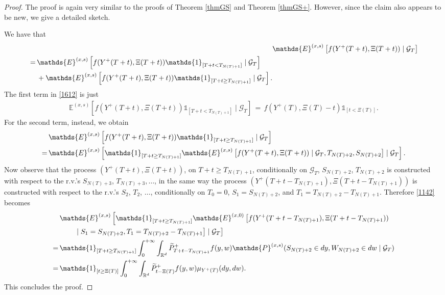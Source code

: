 \documentclass[10pt,a4paper]{amsart}
\newcommand{\wt}{\widetilde}
\begin{document}
	\begin{proof}
		The proof is again very similar to the proofs of Theorem \ref{thmGS} and Theorem \ref{thmGS+}. However, since the claim also appears to be new, we give a detailed sketch.
		
		We have that
		\begin{align}
			&\mathds{E}^{(x,s)} \left[ f(Y^+(T+t), \Xi(T+t)) \mid \mathcal{G}_T \right] \notag \\
			\begin{split}\label{1612}
				\, = \, & \mathds{E}^{(x,s)} \left[ f(Y^+(T+t), \Xi(T+t)) \mathds{1}_{[T+t < T_{N(T)+1}]} \mid \mathcal{G}_T \right] \notag \\ & + \mathds{E}^{(x,s)} \left[ f(Y^+(T+t), \Xi(T+t)) \mathds{1}_{[T+t \geq T_{N(T)+1}]} \mid \mathcal{G}_T \right].
			\end{split}
		\end{align}
		The first term in \eqref{1612} is just
		\begin{align}
			\mathds{E}^{(x,s)} \left[ f(Y^+(T+t), \Xi(T+t)) \mathds{1}_{[T+t < T_{N(T)+1}]} \mid \mathcal{G}_T \right] \, = \, f(Y^+(T), \Xi(T)-t)\mathds{1}_{[t < \Xi(T)]}.
		\end{align}
		For the second term, instead, we obtain
		\begin{align}
			&\mathds{E}^{(x,s)} \left[ f(Y^+(T+t), \Xi(T+t)) \mathds{1}_{[T+t \geq T_{N(T)+1}]} \mid \mathcal{G}_T \right] \notag \\
			= \, &\mathds{E}^{(x,s)} \left[ \mathds{1}_{[T+t \geq T_{N(T)+1}]} \mathds{E}^{(x,s)} \left[  f(Y^+(T+t), \Xi(T+t)) \mid \mathcal{G}_T, T_{N(T)+2}, S_{N(T)+2} \right] \mid \mathcal{G}_T  \right].\label{1142}
		\end{align}
		Now observe that the process $(Y^+(T+t), \Xi(T+t))$, on $T+t \geq T_{N(T)+1}$, conditionally on $\mathcal{G}_T$, $S_{N(T)+2}$, $T_{N(T)+2}$ is constructed with respect to the r.v.'s $S_{N(T)+3}$, $T_{N(T)+3},\dots$, in the same way the process $(Y^+(T+t-T_{N(T)+1}), \Xi(T+t-T_{N(T)+1}))$ is constructed with respect to the r.v.'s $S_2$, $T_2$, $\dots$, conditionally on $T_0=0$, $S_1 = S_{N(T)+2}$, and $T_1 = T_{N(T)+2}-T_{N(T)+1}$. Therefore \eqref{1142} becomes
		\begin{align}
			&\mathds{E}^{(x,s)} \left[ \mathds{1}_{[T+t \geq T_{N(T)+1}]} \mathds{E}^{(x,0)} \left[  f(Y^+(T+t-T_{N(T)+1}), \Xi(T+t-T_{N(T)+1})) \right. \right. \notag  \\ & \left. \left. \qquad \mid S_1=S_{N(T)+2}, T_1= T_{N(T)+2}-T_{N(T)+1} \right] \mid \mathcal{G}_T  \right] \notag \\
			= \, &\mathds{1}_{[T+t \geq T_{N(T)+1}]} \int_0^{+\infty} \int_{\mathbb{R}^d} \wt P^+_{T+t-T_{N(T)+1}}f(y, w) \mathds{P}^{(x,s)} (S_{N(T)+2} \in dy, W_{N(T)+2} \in dw \mid \mathcal{G}_T) \notag \\
			= \, &\mathds{1}_{[t \geq \Xi(T)]} \int_0^{+\infty} \int_{\mathbb{R}^d} {\wt P}^+_{t-\Xi(T)}f(y, w) \mu_{{Y^+(T)}} (dy, dw).
		\end{align} 
		This concludes the proof.
	\end{proof}
\end{document}
